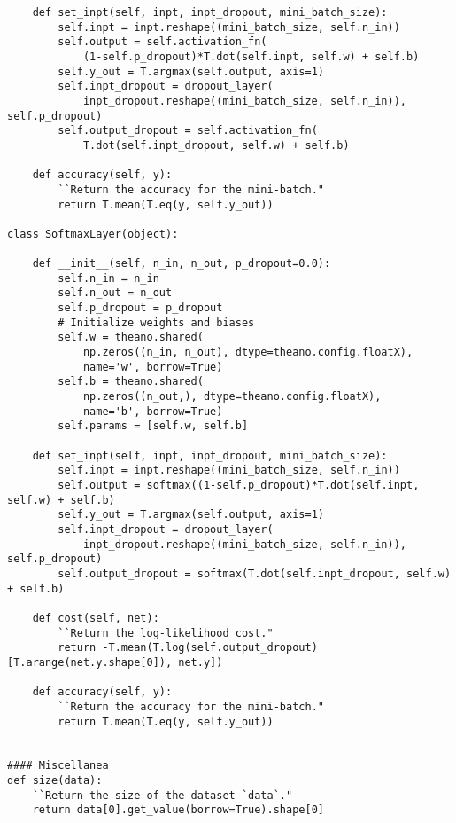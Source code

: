 \begin{lstlisting}
    def set_inpt(self, inpt, inpt_dropout, mini_batch_size):
        self.inpt = inpt.reshape((mini_batch_size, self.n_in))
        self.output = self.activation_fn(
            (1-self.p_dropout)*T.dot(self.inpt, self.w) + self.b)
        self.y_out = T.argmax(self.output, axis=1)
        self.inpt_dropout = dropout_layer(
            inpt_dropout.reshape((mini_batch_size, self.n_in)), self.p_dropout)
        self.output_dropout = self.activation_fn(
            T.dot(self.inpt_dropout, self.w) + self.b)

    def accuracy(self, y):
        ``Return the accuracy for the mini-batch."
        return T.mean(T.eq(y, self.y_out))

class SoftmaxLayer(object):

    def __init__(self, n_in, n_out, p_dropout=0.0):
        self.n_in = n_in
        self.n_out = n_out
        self.p_dropout = p_dropout
        # Initialize weights and biases
        self.w = theano.shared(
            np.zeros((n_in, n_out), dtype=theano.config.floatX),
            name='w', borrow=True)
        self.b = theano.shared(
            np.zeros((n_out,), dtype=theano.config.floatX),
            name='b', borrow=True)
        self.params = [self.w, self.b]

    def set_inpt(self, inpt, inpt_dropout, mini_batch_size):
        self.inpt = inpt.reshape((mini_batch_size, self.n_in))
        self.output = softmax((1-self.p_dropout)*T.dot(self.inpt, self.w) + self.b)
        self.y_out = T.argmax(self.output, axis=1)
        self.inpt_dropout = dropout_layer(
            inpt_dropout.reshape((mini_batch_size, self.n_in)), self.p_dropout)
        self.output_dropout = softmax(T.dot(self.inpt_dropout, self.w) + self.b)

    def cost(self, net):
        ``Return the log-likelihood cost."
        return -T.mean(T.log(self.output_dropout)[T.arange(net.y.shape[0]), net.y])

    def accuracy(self, y):
        ``Return the accuracy for the mini-batch."
        return T.mean(T.eq(y, self.y_out))


#### Miscellanea
def size(data):
    ``Return the size of the dataset `data`."
    return data[0].get_value(borrow=True).shape[0]


\end{lstlisting}

